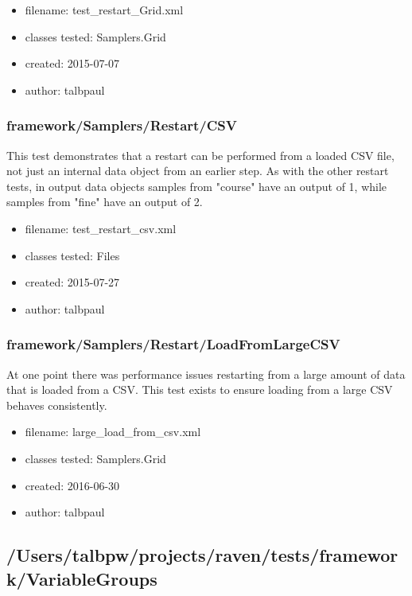       \begin{itemize}
          \item filename: test\_restart\_Grid.xml
          \item classes tested: Samplers.Grid
          \item created: 2015-07-07
          \item author: talbpaul
      \end{itemize}
    \subsubsection{framework/Samplers/Restart/CSV}
      
      This test demonstrates that a restart can be performed from a loaded CSV file, not just an internal data object
      from an earlier step.  As with the other restart tests, in output data objects samples from "course" have an
      output of 1, while samples from "fine" have an output of 2.
    
      \begin{itemize}
          \item filename: test\_restart\_csv.xml
          \item classes tested: Files
          \item created: 2015-07-27
          \item author: talbpaul
      \end{itemize}
    \subsubsection{framework/Samplers/Restart/LoadFromLargeCSV}
      
      At one point there was performance issues restarting from a large amount of data
      that is loaded from a CSV.  This test exists to ensure loading from a large CSV
      behaves consistently.
    
      \begin{itemize}
          \item filename: large\_load\_from\_csv.xml
          \item classes tested: Samplers.Grid
          \item created: 2016-06-30
          \item author: talbpaul
      \end{itemize}
  \subsection{/Users/talbpw/projects/raven/tests/framework/VariableGroups}
